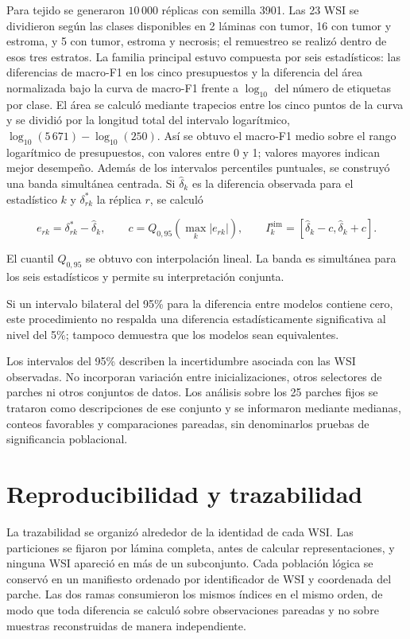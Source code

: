 Para tejido se generaron \(10\,000\) réplicas con semilla 3901. Las 23 WSI se
dividieron según las clases disponibles en 2 láminas con tumor, 16 con tumor y
estroma, y 5 con tumor, estroma y necrosis; el remuestreo se realizó dentro de
esos tres estratos. La familia principal estuvo compuesta por seis
estadísticos: las diferencias de macro-F1 en los cinco presupuestos y la
diferencia del área normalizada bajo la curva de macro-F1 frente a
\(\log_{10}\) del número de etiquetas por clase. El área se calculó mediante
trapecios entre los cinco puntos de la curva y se dividió por la longitud
total del intervalo logarítmico, \(\log_{10}(5\,671)-\log_{10}(250)\).
Así se obtuvo el macro-F1 medio sobre el rango logarítmico de presupuestos,
con valores entre 0 y 1; valores mayores indican mejor desempeño.
Además de los intervalos percentiles
puntuales, se construyó una banda simultánea centrada. Si
\(\widehat\delta_k\) es la diferencia observada para el estadístico \(k\) y
\(\delta^*_{rk}\) la réplica \(r\), se calculó

\begin{equation}
    e_{rk}=\delta^*_{rk}-\widehat\delta_k,\qquad
    c=Q_{0,95}\!\left(\max_k|e_{rk}|\right),\qquad
    I_k^{\mathrm{sim}}=[\widehat\delta_k-c,\widehat\delta_k+c].
    \label{eq:bootstrap-simultaneo-tejido}
\end{equation}

El cuantil \(Q_{0,95}\) se obtuvo con interpolación lineal. La banda es
simultánea para los seis estadísticos y permite su interpretación conjunta.

Si un intervalo bilateral del 95\% para la diferencia entre modelos contiene
cero, este procedimiento no respalda una diferencia estadísticamente
significativa al nivel del 5\%; tampoco demuestra que los modelos sean
equivalentes.

Los intervalos del 95\% describen la incertidumbre asociada con las WSI
observadas. No incorporan variación entre inicializaciones, otros selectores de
parches ni otros conjuntos de datos. Los análisis sobre los 25 parches fijos se
trataron como descripciones de ese conjunto y se informaron mediante medianas,
conteos favorables y comparaciones pareadas, sin denominarlos pruebas de
significancia poblacional.

\section{Reproducibilidad y trazabilidad}

La trazabilidad se organizó alrededor de la identidad de cada WSI. Las
particiones se fijaron por lámina completa, antes de calcular representaciones,
y ninguna WSI apareció en más de un subconjunto. Cada población lógica se
conservó en un manifiesto ordenado por identificador de WSI y coordenada del
parche. Las dos ramas consumieron los mismos índices en el mismo orden, de modo
que toda diferencia se calculó sobre observaciones pareadas y no sobre muestras
reconstruidas de manera independiente.

